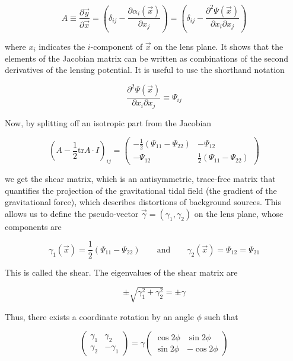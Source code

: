 \begin{equation}
A\equiv\frac{\partial\vec{y}}{\partial\vec{x}}=\left(\delta_{ij}-\frac{\partial\alpha_{i}(\vec{x})}{\partial x_{j}}\right)=\left(\delta_{ij}-\frac{\partial^{2}\Psi(\vec{x})}{\partial x_{i}\partial x_{j}}\right)
\end{equation}

where $x_i$ indicates the $i$-component of $\vec{x}$ on the lens plane. It shows that the elements of the Jacobian matrix can be written as combinations of the second derivatives of the lensing potential. It is useful to use the shorthand notation

\begin{equation}
\frac{\partial^{2}\Psi(\vec{x})}{\partial x_{i}\partial x_{j}}\equiv\Psi_{ij}
\end{equation}

Now, by splitting off an isotropic part from the Jacobian

\begin{equation}
\left(A-\frac{1}{2}\text{tr}A\cdot I\right)_{ij}=\left(\begin{array}{cc}
-\frac{1}{2}\left(\Psi_{11}-\Psi_{22}\right) & -\Psi_{12}\\
-\Psi_{12} & \frac{1}{2}\left(\Psi_{11}-\Psi_{22}\right)
\end{array}\right)
\end{equation}

we get the shear matrix, which is an antisymmetric, trace-free matrix that quantifies the projection of the gravitational tidal field (the gradient of the gravitational force), which describes distortions of background sources.  This allows us to define the pseudo-vector $\vec{\gamma}=(\gamma_1 , \gamma_2)$ on the lens plane, whose components are

\begin{equation}
\gamma_1(\vec{x})=\frac{1}{2}(\Psi_{11}-\Psi_{22})\qquad \text{and} \qquad \gamma_2(\vec{x})=\Psi_{12} = \Psi_{21}
\end{equation}

This is called the shear. The eigenvalues of the shear matrix are 

\begin{equation}
\pm \sqrt{\gamma_1^2 + \gamma_2^2} = \pm \gamma
\end{equation}

Thus, there exists a coordinate rotation by an angle $\phi$ such that 

\begin{equation}
\left(\begin{array}{cc}
\gamma_{1} & \gamma_{2}\\
\gamma_{2} & -\gamma_{1}
\end{array}\right)=\gamma\left(\begin{array}{cc}
\cos2\phi & \sin2\phi\\
\sin2\phi & -\cos2\phi
\end{array}\right)
\end{equation}

